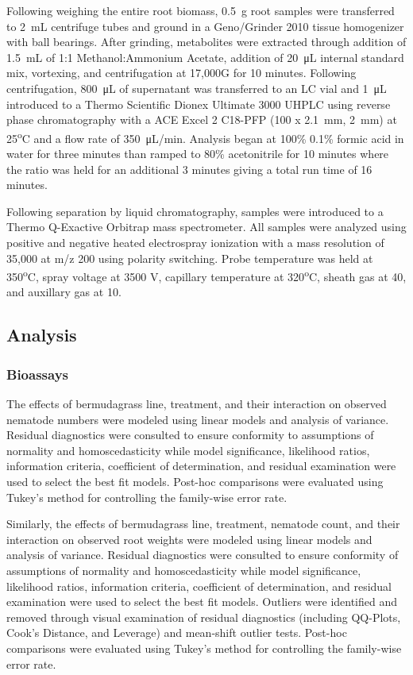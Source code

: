 \documentclass[fleqn,10pt]{wlscirep}
\begin{document}
Following weighing the entire root biomass, \SI{0.5}{\gram} root samples were transferred to \SI{2}{\milli\liter} centrifuge tubes and ground in a Geno/Grinder 2010 tissue homogenizer with ball bearings.  After grinding, metabolites were extracted through addition of \SI{1.5}{\milli\liter} of 1:1 Methanol:Ammonium Acetate, addition of \SI{20}{\micro\liter} internal standard mix, vortexing, and centrifugation at 17,000G for 10 minutes.  Following centrifugation, \SI{800}{\micro\liter} of supernatant was transferred to an LC vial and \SI{1}{\micro\liter} introduced to a Thermo Scientific Dionex Ultimate 3000 UHPLC using reverse phase chromatography with a ACE Excel 2 C18-PFP (100 x \SI{2.1}{\milli\meter}, \SI{2}{\milli\meter}) at 25\textsuperscript{o}C and a flow rate of \SI{350}{\micro\liter}/min.  Analysis began at 100\% 0.1\% formic acid in water for three minutes than ramped to 80\% acetonitrile for 10 minutes where the ratio was held for an additional 3 minutes giving a total run time of 16 minutes.  

Following separation by liquid chromatography, samples were introduced to a Thermo Q-Exactive Orbitrap mass spectrometer.  All samples were analyzed using positive and negative heated electrospray ionization with a mass resolution of 35,000 at m/z 200 using polarity switching. Probe temperature was held at 350\textsuperscript{o}C, spray voltage at 3500 V, capillary temperature at 320\textsuperscript{o}C, sheath gas at 40, and auxillary gas at 10.  


\subsection*{Analysis}

\subsubsection*{Bioassays}

The effects of bermudagrass line, treatment, and their interaction on observed nematode numbers were modeled using linear models and analysis of variance.  Residual diagnostics were consulted to ensure conformity to assumptions of normality and homoscedasticity while model significance, likelihood ratios, information criteria, coefficient of determination, and residual examination were used to select the best fit models.  Post-hoc comparisons were evaluated using Tukey's method for controlling the family-wise error rate. 

Similarly, the effects of bermudagrass line, treatment, nematode count, and their interaction on observed root weights were modeled using linear models and analysis of variance. Residual diagnostics were consulted to ensure conformity of assumptions of normality and homoscedasticity while model significance, likelihood ratios, information criteria, coefficient of determination, and residual examination were used to select the best fit models.  Outliers were identified and removed through visual examination of residual diagnostics (including QQ-Plots, Cook's Distance, and Leverage) and mean-shift outlier tests.  Post-hoc comparisons were evaluated using Tukey's method for controlling the family-wise error rate.
\end{document}
